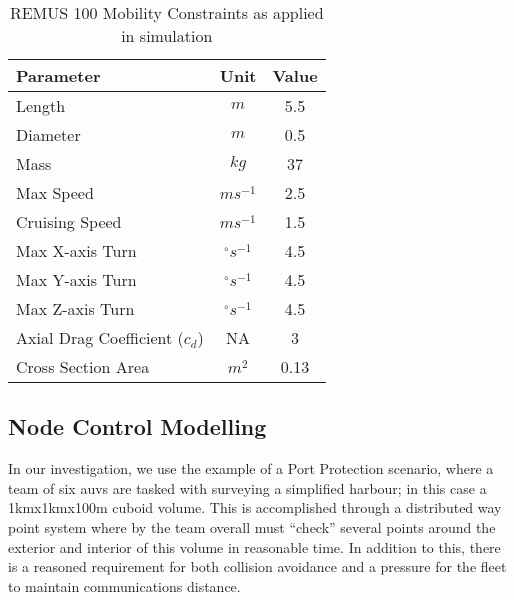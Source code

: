 \begin{table}
  \caption{REMUS 100 Mobility Constraints as applied in simulation} \label{tab:mobility_sysconstraints}
  \begin{center}
    \setlength{\tabcolsep}{8pt}
    \begin{tabular}{lcc}
      \toprule
      Parameter & Unit & Value \\
      \midrule
      Length & $m$ & 5.5\\
      Diameter & $m$ & 0.5\\
      Mass & $kg$ & 37 \\ 
      Max Speed & $ms^{-1}$ & 2.5\\
      Cruising Speed & $ms^{-1}$ & 1.5\\
      Max X-axis Turn & $^{\circ} s^{-1}$ & 4.5\\
      Max Y-axis Turn & $^{\circ} s^{-1}$ & 4.5\\
      Max Z-axis Turn & $^{\circ} s^{-1}$ & 4.5\\
      Axial Drag Coefficient ($c_d$) & NA & 3\\
      Cross Section Area & $m^2$ & 0.13\\
      \bottomrule
    \end{tabular}
    \setlength{\tabcolsep}{6pt}
  \end{center}
\end{table}

\subsection{Node Control Modelling}

In our investigation, we use the example of a Port Protection scenario, where a team of six \glspl{auv} are tasked with surveying a simplified harbour; in this case a 1kmx1kmx100m cuboid volume.
This is accomplished through a distributed way point system where by the team overall must ``check'' several points around the exterior and interior of this volume in reasonable time.
In addition to this, there is a reasoned requirement for both collision avoidance and a pressure for the fleet to maintain communications distance.

